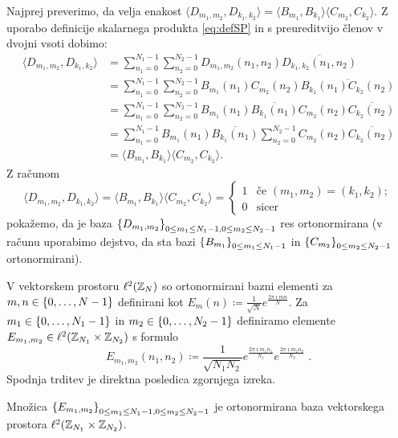 \begin{dokaz}
Najprej preverimo, da velja enakost $\langle D_{m_1, m_2}, D_{k_1, k_2}\rangle = \langle B_{m_1}, B_{k_1} \rangle \langle C_{m_2}, C_{k_2}\rangle$. Z uporabo definicije skalarnega produkta \eqref{eq:defSP} in s preureditvijo členov v dvojni vsoti dobimo:
%
\begin{align*}
\langle D_{m_1, m_2}, D_{k_1, k_2}\rangle & = \sum_{n_1 = 0}^{N_1 - 1} \sum_{n_2 = 0}^{N_2 - 1} D_{m_1, m_2}(n_1, n_2)\overline{D_{k_1, k_2}(n_1, n_2)} \\
& = \sum_{n_1 = 0}^{N_1 - 1} \sum_{n_2 = 0}^{N_2 - 1} B_{m_1}(n_1)C_{m_2}(n_2) \overline{B_{k_1}(n_1)C_{k_2}(n_2)} \\
& = \sum_{n_1 = 0}^{N_1 - 1} \sum_{n_2 = 0}^{N_2 - 1} B_{m_1}(n_1)\overline{B_{k_1}(n_1)}C_{m_2}(n_2) \overline{C_{k_2}(n_2)} \\
& = \sum_{n_1 = 0}^{N_1 - 1} B_{m_1}(n_1)\overline{B_{k_1}(n_1)} \sum_{n_2 = 0}^{N_2 - 1} C_{m_2}(n_2) \overline{C_{k_2}(n_2)} \\
& = \langle B_{m_1}, B_{k_1} \rangle \langle C_{m_2}, C_{k_2}\rangle.
\end{align*}
%
Z računom
$$\langle D_{m_1, m_2}, D_{k_1, k_2}\rangle = \langle B_{m_1}, B_{k_1} \rangle \langle C_{m_2}, C_{k_2}\rangle =
\begin{cases}
1 & \mbox{če } (m_1, m_2) = (k_1, k_2); \\
0 & \mbox{sicer}
\end{cases}
$$
pokažemo, da je baza $\left\{D_{m_1, m_2}\right\}_{0 \leq m_1 \leq N_1 - 1, 0 \leq m_2 \leq N_2 - 1}$ res ortonormirana (v računu uporabimo dejstvo, da sta bazi $\left\{B_{m_1}\right\}_{0 \leq m_1 \leq N_1-1}$ in $\left\{C_{m_2}\right\}_{0 \leq m_2 \leq N_2-1}$ ortonormirani).
%
\end{dokaz}
%
V vektorskem prostoru $\ell^2(\mathbb Z_N)$ so ortonormirani bazni elementi za $m,n \in \left\{0, \ldots, N-1\right\}$ definirani kot
$E_m(n) \coloneqq \frac{1}{\sqrt{N}} e^{\frac{2\pi \imath mn}{N}}$.
Za $m_1 \in \left\{0, \ldots, N_1-1\right\}$ in $m_2 \in \left\{0, \ldots, N_2-1\right\}$ definiramo elemente $E_{m_1, m_2} \in \ell^2(\mathbb Z_{N_1} \times \mathbb Z_{N_2})$ s formulo
$$E_{m_1, m_2}(n_1, n_2) \coloneqq \frac{1}{\sqrt{N_1N_2}} e^{\frac{2\pi \imath m_1n_1}{N_1}} e^{\frac{2\pi \imath m_2n_2}{N_2}} \;.$$
Spodnja trditev je direktna posledica zgornjega izreka.
%
\begin{trditev}
Množica $\left\{E_{m_1, m_2}\right\}_{0 \leq m_1 \leq N_1-1, 0 \leq m_2 \leq N_2-1}$ je ortonormirana baza vek\-tor\-ske\-ga prostora $\ell^2(\mathbb Z_{N_1} \times \mathbb Z_{N_2})$.
\end{trditev}
